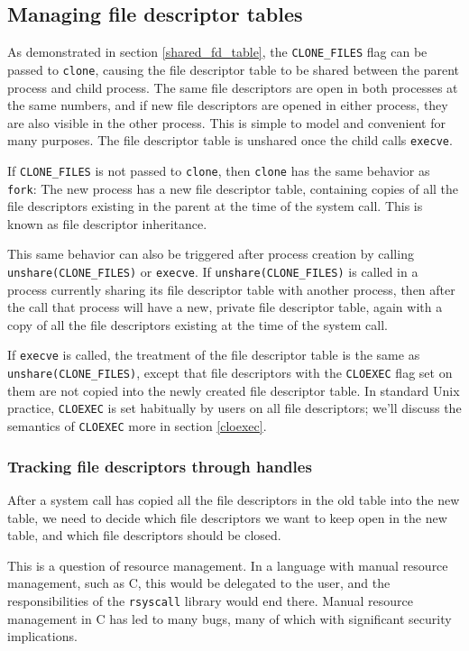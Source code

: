 \documentclass[sigplan]{acmart}
\begin{document}
\subsection{Managing file descriptor tables}\label{fdtables}
As demonstrated in section \ref{shared_fd_table},
the \verb|CLONE_FILES| flag can be passed to \texttt{clone},
causing the file descriptor table to be shared between the parent process and child process.
The same file descriptors are open in both processes at the same numbers,
and if new file descriptors are opened in either process,
they are also visible in the other process.
This is simple to model and convenient for many purposes.
The file descriptor table is unshared once the child calls \texttt{execve}.

If \verb|CLONE_FILES| is not passed to \texttt{clone},
then \texttt{clone} has the same behavior as \texttt{fork}:
The new process has a new file descriptor table,
containing copies of all the file descriptors existing in the parent at the time of the system call.
This is known as file descriptor inheritance.

This same behavior can also be triggered after process creation by calling \verb|unshare(CLONE_FILES)| or \texttt{execve}.
If \verb|unshare(CLONE_FILES)|
is called in a process currently sharing its file descriptor table with another process,
then after the call that process will have a new, private file descriptor table,
again with a copy of all the file descriptors existing at the time of the system call.

If \texttt{execve} is called,
the treatment of the file descriptor table is the same as \verb|unshare(CLONE_FILES)|,
except that file descriptors with the \texttt{CLOEXEC} flag set on them
are not copied into the newly created file descriptor table.
In standard Unix practice, \texttt{CLOEXEC} is set habitually by users on all file descriptors;
we'll discuss the semantics of \texttt{CLOEXEC} more in section \ref{cloexec}.
\subsubsection{Tracking file descriptors through handles}
After a system call has copied all the file descriptors in the old table into the new table,
we need to decide which file descriptors we want to keep open in the new table,
and which file descriptors should be closed.

This is a question of resource management.
In a language with manual resource management,
such as C,
this would be delegated to the user,
and the responsibilities of the \texttt{rsyscall} library would end there.
Manual resource management in C has led to many bugs,
many of which with significant security implications.
\end{document}

